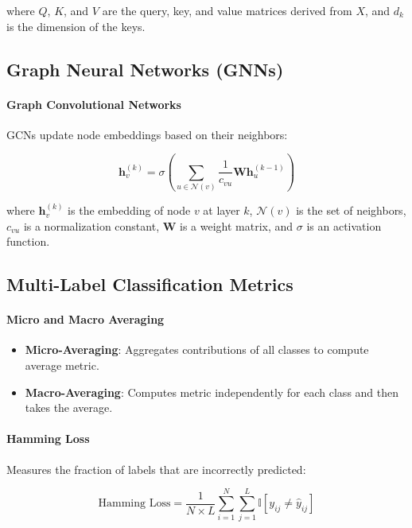 \documentclass[12pt, a4paper]{article}
\begin{document}
where \( Q \), \( K \), and \( V \) are the query, key, and value matrices derived from \( X \), and \( d_k \) is the dimension of the keys.

\subsection{Graph Neural Networks (GNNs)}

\paragraph{Graph Convolutional Networks}

GCNs update node embeddings based on their neighbors:

\begin{equation}
\mathbf{h}_v^{(k)} = \sigma \left( \sum_{u \in \mathcal{N}(v)} \frac{1}{c_{vu}} \mathbf{W} \mathbf{h}_u^{(k-1)} \right)
\end{equation}

where \( \mathbf{h}_v^{(k)} \) is the embedding of node \( v \) at layer \( k \), \( \mathcal{N}(v) \) is the set of neighbors, \( c_{vu} \) is a normalization constant, \( \mathbf{W} \) is a weight matrix, and \( \sigma \) is an activation function.

\subsection{Multi-Label Classification Metrics}

\paragraph{Micro and Macro Averaging}

\begin{itemize}
    \item \textbf{Micro-Averaging}: Aggregates contributions of all classes to compute average metric.
    \item \textbf{Macro-Averaging}: Computes metric independently for each class and then takes the average.
\end{itemize}

\paragraph{Hamming Loss}

Measures the fraction of labels that are incorrectly predicted:

\begin{equation}
\text{Hamming Loss} = \frac{1}{N \times L} \sum_{i=1}^{N} \sum_{j=1}^{L} \mathbb{I}[y_{ij} \neq \hat{y}_{ij}]
\end{equation}
\end{document}
